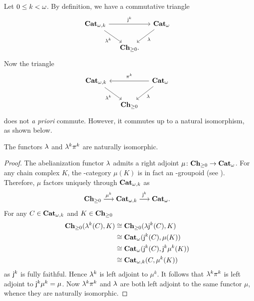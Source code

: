 \begin{paragr}\label{paragr:abelloc}
  Let $0 \leq k < \omega$. By definition,
  we have a commutative triangle
  \[
    \begin{tikzcd}[column sep=small]
      \opCat{k}\ar[rr,"\oemb{k}"]\ar[rd,"\abelk{k}"']&& \oCat\ar[dl,"\abel"] \\
      &\Chp.&
  \end{tikzcd}
\]
Now the triangle
 \[
    \begin{tikzcd}[column sep=small]
      \opCat{k}\ar[rd,"\abelk{k}"']&& \oCat\ar[dl,"\abel"] \ar[ll,"\opifun{k}"']\\
      &\Chp&
  \end{tikzcd}
\]
does not {\em a priori} commute. However, it commutes up to a natural
isomorphism, as shown below.
\end{paragr}
\begin{lemma}\label{lemma:abelpi}
  The functors $\mathsf{\lambda}$ and $\mathsf{\mathsf{\lambda}}^{k}\mathsf{\pi}_{}^{k}$ are naturally isomorphic.
\end{lemma}
\begin{proof}
The abelianization functor $\mathsf{\lambda}$ admits a right adjoint $\mu \colon
\mathbf{Ch}_{\geq 0} \to \mathbf{Cat}_{\omega}$. For any chain complex $K$, the
\oo-category $\mu(K)$ is in fact an \oo\nbd-groupoid (see \cite[Paragraph
  17.4.3]{abgmmm:polybk}). Therefore, $\mu$ factors uniquely through  $\mathbf{Cat}_{\omega,k}$ as
  \[
    \mathbf{Ch}_{\geq 0} \overset{\mu^k}{\longrightarrow} \mathbf{Cat}_{\omega,k}
    \overset{\mathsf{j}_{}^{k}}{\longrightarrow} \mathbf{Cat}_{\omega}.
  \] 
  For any $C\in\mathbf{Cat}_{\omega,k}$ and $K\in\mathbf{Ch}_{\geq 0}$
  \begin{align*}
    \mathbf{Ch}_{\geq 0}(\mathsf{\mathsf{\lambda}}^{k}(C),K) &\cong
                                     \mathbf{Ch}_{\geq 0}(\mathsf{\lambda}\mathsf{j}_{}^{k}(C),K)\\
                                                     &\cong
                                                       \mathbf{Cat}_{\omega}(\mathsf{j}_{}^{k}(C),\mu(K))\\
                                                     & \cong
                                                       \mathbf{Cat}_{\omega}(\mathsf{j}_{}^{k}(C),\mathsf{j}_{}^{k}\mu^k(K))\\
                                   &\cong \mathbf{Cat}_{\omega,k}(C,\mu^k(K))
                                   \end{align*}
  as $\mathsf{j}_{}^{k}$ is fully faithful. Hence $\mathsf{\mathsf{\lambda}}^{k}$ is left adjoint
  to $\mu^k$. It follows that $\mathsf{\mathsf{\lambda}}^{k}\mathsf{\pi}_{}^{k}$ is left adjoint to
  $\mathsf{j}_{}^{k}\mu^k=\mu$. Now $\mathsf{\mathsf{\lambda}}^{k}\mathsf{\pi}_{}^{k}$ and
  $\mathsf{\lambda}$ are both left adjoint to the same functor $\mu$, whence
  they are naturally isomorphic.
\end{proof}


